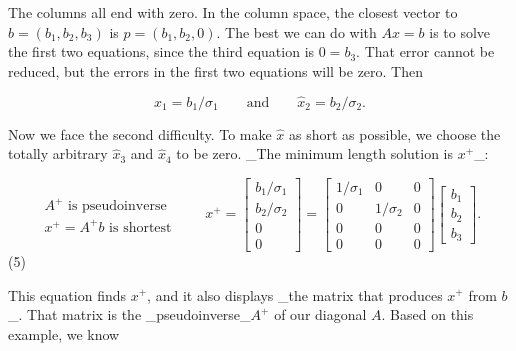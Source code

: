The columns all end with zero. In the column space, the closest vector to \(b=(b_{1},b_{2},b_{3})\) is \(p=(b_{1},b_{2},0)\). The best we can do with \(Ax=b\) is to solve the first two equations, since the third equation is \(0=b_{3}\). That error cannot be reduced, but the errors in the first two equations will be zero. Then

\[\widehat{x}_{1}=b_{1}/\sigma_{1}\qquad\text{and}\qquad\widehat{x}_{2}=b_{2}/ \sigma_{2}.\]

Now we face the second difficulty. To make \(\widehat{x}\) as short as possible, we choose the totally arbitrary \(\widehat{x}_{3}\) and \(\widehat{x}_{4}\) to be zero. _The minimum length solution is \(x^{+}\)_:

\[\begin{array}{l}A^{+}\text{ is pseudoinverse}\\ x^{+}=A^{+}b\text{ is shortest}\end{array}\qquad x^{+}=\begin{bmatrix}b_{1}/ \sigma_{1}\\ b_{2}/\sigma_{2}\\ 0\\ 0\end{bmatrix}=\begin{bmatrix}1/\sigma_{1}&0&0\\ 0&1/\sigma_{2}&0\\ 0&0&0\\ 0&0&0\end{bmatrix}\begin{bmatrix}b_{1}\\ b_{2}\\ b_{3}\end{bmatrix}.\] (5)

This equation finds \(x^{+}\), and it also displays _the matrix that produces \(x^{+}\) from \(b\)_. That matrix is the _pseudoinverse_\(A^{+}\) of our diagonal \(A\). Based on this example, we know 